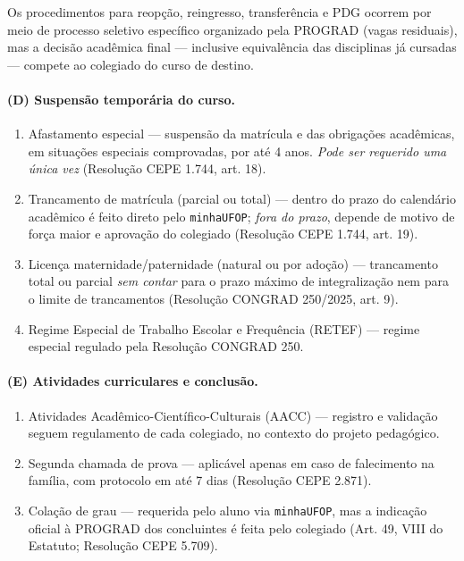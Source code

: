 \documentclass[10pt,a4paper]{extarticle}
\newcommand{\impt}[1]{\textcolor{important}{#1}}
\newcommand{\ntc}[1]{\textcolor{notice}{#1}}
\begin{document}
\ntc{Os procedimentos para reopção, reingresso, transferência e PDG ocorrem por meio de \impt{processo seletivo específico} organizado pela PROGRAD (vagas residuais), mas a decisão acadêmica final --- inclusive equivalência das disciplinas já cursadas --- compete ao colegiado do curso de destino.}

\paragraph{(D) Suspensão temporária do curso.}

\begin{enumerate}[label=(\arabic*), resume]
    \item \impt{Afastamento especial} --- suspensão da matrícula e das obrigações acadêmicas, em situações especiais comprovadas, por até 4 anos. \emph{Pode ser requerido uma única vez} (Resolução CEPE 1.744, art. 18).
    \item \impt{Trancamento de matrícula} (parcial ou total) --- dentro do prazo do calendário acadêmico é feito direto pelo \texttt{minhaUFOP}; \emph{fora do prazo}, depende de motivo de força maior e aprovação do colegiado (Resolução CEPE 1.744, art. 19).
    \item \impt{Licença maternidade/paternidade} (natural ou por adoção) --- trancamento total ou parcial \emph{sem contar} para o prazo máximo de integralização nem para o limite de trancamentos (Resolução CONGRAD 250/2025, art. 9).
    \item \impt{Regime Especial de Trabalho Escolar e Frequência (RETEF)} --- regime especial regulado pela Resolução CONGRAD 250.
\end{enumerate}

\paragraph{(E) Atividades curriculares e conclusão.}

\begin{enumerate}[label=(\arabic*), resume]
    \item \impt{Atividades Acadêmico-Científico-Culturais (AACC)} --- registro e validação seguem regulamento de cada colegiado, no contexto do projeto pedagógico.
    \item \impt{Segunda chamada de prova} --- aplicável apenas em caso de falecimento na família, com protocolo em até 7 dias (Resolução CEPE 2.871).
    \item \impt{Colação de grau} --- requerida pelo aluno via \texttt{minhaUFOP}, mas a \impt{indicação oficial} à PROGRAD dos concluintes é feita pelo colegiado (Art. 49, VIII do Estatuto; Resolução CEPE 5.709).
\end{enumerate}
\end{document}
